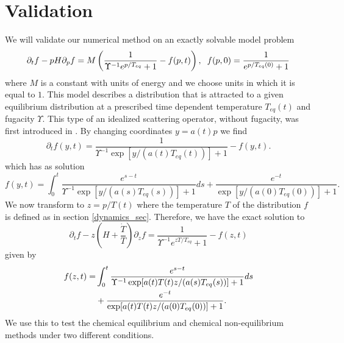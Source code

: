 \section{Validation}\label{validation}
We will validate our numerical method on an exactly solvable model problem
\begin{equation}\label{toy_eq}
\partial_t f-pH \partial_p f=M\left(\frac{1}{\Upsilon^{-1}e^{p/T_{eq}}+1}-f(p,t)\right), \hspace{2mm} f(p,0)=\frac{1}{e^{p/T_{eq}(0)}+1}
\end{equation}
where $M$ is a constant with units of energy and we choose units in which it is equal to $1$. This model describes a distribution that is attracted to a given equilibrium distribution at a prescribed time dependent temperature $T_{eq}(t)$ and fugacity $\Upsilon$. This type of an idealized scattering operator, without fugacity, was first introduced in \cite{Anderson_Witting}. By changing coordinates $y=a(t)p$ we find
\begin{equation}\label{free_stream_toy}
\partial_tf(y,t)=\frac{1}{\Upsilon^{-1}\exp[y/(a(t)T_{eq}(t))]+1}-f(y,t).
\end{equation}
 which has as solution
\begin{equation}\label{exact_sol}
f(y,t)=\int_0^t\frac{e^{s-t}}{\Upsilon^{-1}\exp[y/(a(s)T_{eq}(s))]+1}ds+\frac{e^{-t}}{\exp[y/(a(0)T_{eq}(0))]+1}.
\end{equation}
We now transform to $z=p/T(t)$ where the temperature $T$ of the distribution $f$ is defined as in section \ref{dynamics_sec}.  Therefore, we have the exact solution to
\begin{equation}\label{k_eq_toy}
\partial_tf-z\left(H+\frac{\dot{T}}{T}\right)\partial_zf=\frac{1}{\Upsilon^{-1}e^{zT/T_{eq}}+1}-f(z,t)
\end{equation}
given by
\begin{align}
f(z,t)=&\int_0^t\frac{e^{s-t}}{\Upsilon^{-1}\exp[a(t)T(t)z/(a(s)T_{eq}(s))]+1}ds\\
&+\frac{e^{-t}}{\exp[a(t)T(t)z/(a(0)T_{eq}(0))]+1}.\notag
\end{align}
We use this to test the chemical equilibrium and chemical non-equilibrium methods under two different conditions. 

